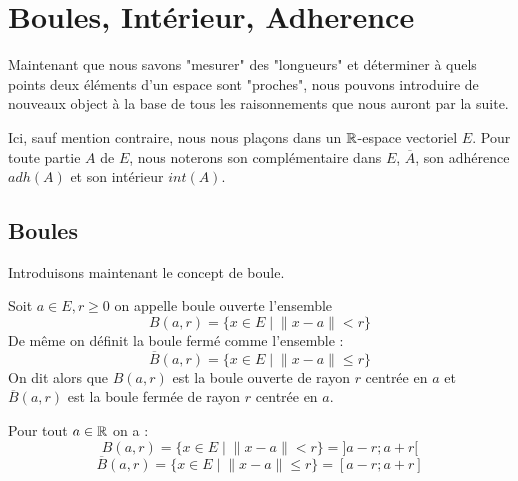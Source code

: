\chapter{Boules, Intérieur, Adherence}

\justify

\setlength{\parindent}{0pt}
\renewcommand{\labelitemi}{\textbullet} %


Maintenant que nous savons "mesurer" des "longueurs" et déterminer à quels points deux éléments d'un espace sont 
"proches", nous pouvons introduire de nouveaux object à la base de tous les raisonnements que nous auront par la suite. 

\vspace{0.3cm}

Ici, sauf mention contraire, nous nous plaçons dans un $\mathbb{R}$-espace vectoriel $E$. 
Pour toute partie $A$ de $E$, nous noterons son complémentaire dans $E$, $\overline{A}$, 
son adhérence $adh(A)$ et son intérieur $int(A)$. 


\section{Boules}

Introduisons maintenant le concept de boule. 

\begin{definition}
    Soit $a \in E, r \geqslant 0$ on appelle {boule ouverte} l'ensemble 
        \[ B(a,r) = \{ x \in E \; | \; \| x - a\| <  r\} \] 
    De même on définit la boule fermé comme l'ensemble :
    \[ \overline{B}(a,r) = \{ x \in E \; | \; \| x - a\| \leqslant r\} \] 
    On dit alors que $B(a,r)$ est la boule ouverte de rayon $r$ centrée en $a$ et 
    $\overline{B}(a,r)$ est la boule fermée de rayon $r$ centrée en $a$. 
\end{definition}

\begin{example}
    Pour tout $a \in \mathbb{R}$ on a :
        \[B(a,r) = \{ x \in E \; | \; \| x - a\| <  r\} = ]a - r ; a + r [ \]
        \[\overline{B}(a,r) = \{ x \in E \; | \; \| x - a\| \leqslant  r\} = [a - r ; a + r ] \]
\end{example}

